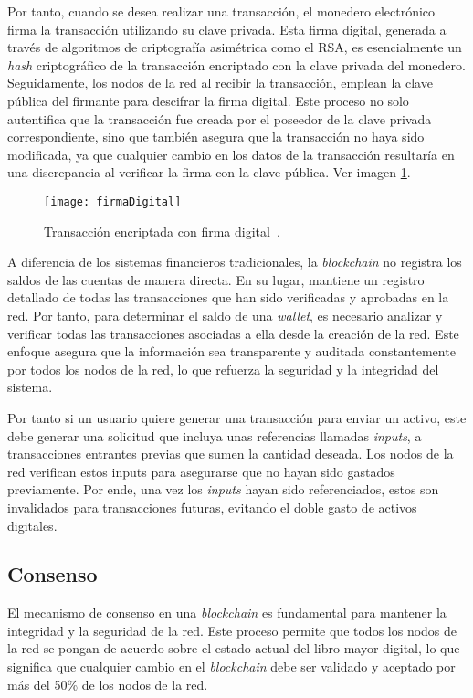 Por tanto, cuando se desea realizar una transacción, el monedero electrónico firma la transacción utilizando su clave privada. Esta firma digital, generada a través de algoritmos de criptografía asimétrica como el RSA, es esencialmente un \textit{hash} criptográfico de la transacción encriptado con la clave privada del monedero.
Seguidamente, los nodos de la red al recibir la transacción, emplean la clave pública del firmante para descifrar la firma digital. Este proceso no solo autentifica que la transacción fue creada por el poseedor de la clave privada correspondiente, sino que también asegura que la transacción no haya sido modificada, ya que cualquier cambio en los datos de la transacción resultaría en una discrepancia al verificar la firma con la clave pública. Ver imagen \ref{fig:firmaDigital}.

\begin{figure}[h]
	\centering
	\texttt{[image: firmaDigital]}
	\caption[Transacción blockchain]{Transacción encriptada con firma digital~\cite{BlockchainFuncionamiento}.}
	\label{fig:firmaDigital}
\end{figure}

A diferencia de los sistemas financieros tradicionales, la \textit{blockchain} no registra los saldos de las cuentas de manera directa. En su lugar, mantiene un registro detallado de todas las transacciones que han sido verificadas y aprobadas en la red.
Por tanto, para determinar el saldo de una \textit{wallet}, es necesario analizar y verificar todas las transacciones asociadas a ella desde la creación de la red. Este enfoque asegura que la información sea transparente y auditada constantemente por todos los nodos de la red, lo que refuerza la seguridad y la integridad del sistema.

Por tanto si un usuario quiere generar una transacción para enviar un activo, este debe generar una solicitud que incluya unas referencias llamadas \textit{inputs}, a transacciones entrantes previas que sumen la cantidad deseada. Los nodos de la red verifican estos inputs para asegurarse que no hayan sido gastados previamente.
Por ende, una vez los \textit{inputs} hayan sido referenciados, estos son invalidados para transacciones futuras, evitando el doble gasto de activos digitales.


\subsection{Consenso}

El mecanismo de consenso en una \textit{blockchain} es fundamental para mantener la integridad y la seguridad de la red. Este proceso permite que todos los nodos de la red se pongan de acuerdo sobre el estado actual del libro mayor digital, lo que significa que cualquier cambio en el \textit{blockchain} debe ser validado y aceptado por más del 50\% de los nodos de la red.

